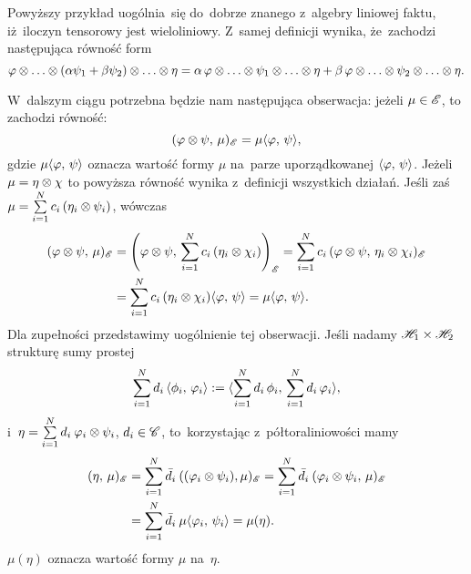 \documentclass[a4paper,11pt]{article}
\begin{document}
Powyższy przykład uogólnia~się do~dobrze znanego z~algebry liniowej
faktu, iż~iloczyn tensorowy jest wieloliniowy. Z~samej definicji
wynika, że~zachodzi następująca równość form
\begin{equation*}
  \varphi \otimes \ldots \otimes ( \alpha \psi_{ 1 } + \beta \psi_{ 2 } ) \otimes \ldots \otimes \eta
  = \alpha \, \varphi \otimes \ldots \otimes \psi_{ 1 } \otimes \ldots \otimes \eta
  + \beta \, \varphi \otimes \ldots \otimes \psi_{ 2 } \otimes \ldots \otimes \eta.
\end{equation*}

W~dalszym ciągu potrzebna będzie nam następująca obserwacja: jeżeli
$\mu \in \mathcal{E}$, to zachodzi równość:
\begin{equation*}
  (  \varphi \otimes \psi , \,  \mu  )_{ \mathcal{E} } = \mu\langle  \varphi , \,  \psi  \rangle,
\end{equation*}
gdzie $\mu\langle  \varphi , \,  \psi  \rangle$ oznacza wartość formy $\mu$ na~parze
uporządkowanej $\langle  \varphi , \,  \psi  \rangle$. Jeżeli $\mu = \eta \otimes \chi$ to
powyższa równość wynika z~definicji wszystkich działań. Jeśli zaś
$\mu = \sum\limits_{ i = 1 }^{ N } c_{ i } \, ( \eta_{ i } \otimes \psi_{ i } )$,
wówczas
\begin{equation*}
  \begin{split}
    (  \varphi \otimes \psi , \,  \mu  )_{ \mathcal{E} } &= \left( \varphi \otimes \psi, \,
      \sum\limits_{ i = 1 }^{ N } c_{ i } \, ( \eta_{ i } \otimes \chi_{ i } )
    \right)_{ \mathcal{E} } = \sum\limits_{ i = 1 }^{ N } c_{ i } \, (  \varphi \otimes
      \psi , \,  \eta_{ i } \otimes \chi_{ i }  )_{ \mathcal{E} } \\
    &= \sum\limits_{ i = 1 }^{ N } c_{ i } \, ( \eta_{ i } \otimes \chi_{ i } )
    \langle  \varphi , \,  \psi  \rangle = \mu\langle  \varphi , \,  \psi  \rangle.
  \end{split}
\end{equation*}
Dla zupełności przedstawimy uogólnienie tej obserwacji. Jeśli nadamy
$\mathcal{H}_{ 1 } \times \mathcal{H}_{ 2 }$ strukturę sumy prostej
\begin{equation}
  \label{eq:4}
  \sum\limits_{ i = 1 }^{ N } d_{ i } \, \langle  \phi_{ i } , \,  \varphi_{ i }  \rangle
  := \langle \sum\limits_{ i = 1 }^{ N } d_{ i } \, \phi_{ i }, \,
  \sum\limits_{ i = 1 }^{ N } d_{ i } \, \varphi_{ i } \rangle,
\end{equation}
i~$\eta = \sum\limits_{ i = 1 }^{ N } d_{ i } \: \varphi_{ i } \otimes \psi_{ i }$,
$d_{ i } \in \mathcal{C}$, to~korzystając z~półtoraliniowości mamy
\begin{equation*}
  \begin{split}
    ( \eta, \, \mu )_{ \mathcal{E} } &= \sum\limits_{ i = 1 }^{ N } \bar{ d }_{ i
    } \: ( ( \varphi_{ i } \otimes \psi_{ i } ), \mu )_{ \mathcal{E} } = \sum\limits_{ i =
      1 }^{ N } \bar{ d }_{ i } \:
    (  \varphi_{ i } \otimes \psi_{ i } , \,  \mu  )_{ \mathcal{E} } \\
    &= \sum\limits_{ i = 1 }^{ N } \bar{ d }_{ i } \: \mu \langle \varphi_{ i }, \,
    \psi_{ i } \rangle = \mu( \eta ).
  \end{split}
\end{equation*}
$\mu( \eta )$ oznacza wartość formy $\mu$ na~$\eta$.
\end{document}
